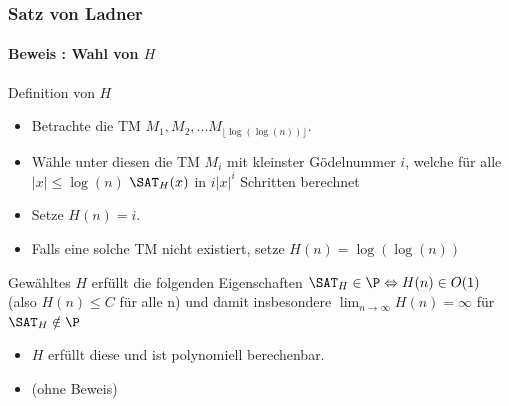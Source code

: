 \begin{frame}
	\frametitle{Satz von Ladner}
	\framesubtitle{Beweis : Wahl von $H$}
	\begin{KITinfoblock}{Definition von $H$}
		\begin{itemize}
		\item Betrachte die TM $M_1, M_2, ... M_{\lfloor \log(\log(n)) \rfloor}$. \newline
		\item Wähle unter diesen die TM $M_i$ mit kleinster Gödelnummer $i$, welche für alle
		$|x| \leq \log(n) $  ${\SAT}_H(x)$
		in $i|x|^i$ Schritten berechnet
		\item Setze $H(n) = i$. 
		\item Falls eine solche TM nicht existiert, setze $H(n) = \log(\log(n))$
		\end{itemize}
	\end{KITinfoblock}
	\pause
	\begin{KITblock}{Gewähltes $H$ erfüllt die folgenden Eigenschaften}
		${\SAT}_H \in \P \Leftrightarrow H(n) \in O(1)$ (also $H(n) \leq C$ f\"ur alle n) 				\newline
		und damit insbesondere $\lim_{n \to \infty}  H(n) = \infty$ f\"ur ${\SAT}_H
		\notin \P$
	\end{KITblock}
	\pause
	\begin{itemize}
	  \item  $H$ erfüllt diese und ist polynomiell berechenbar.
	  \item (ohne Beweis)
	\end{itemize}
		
\end{frame}
% 	
